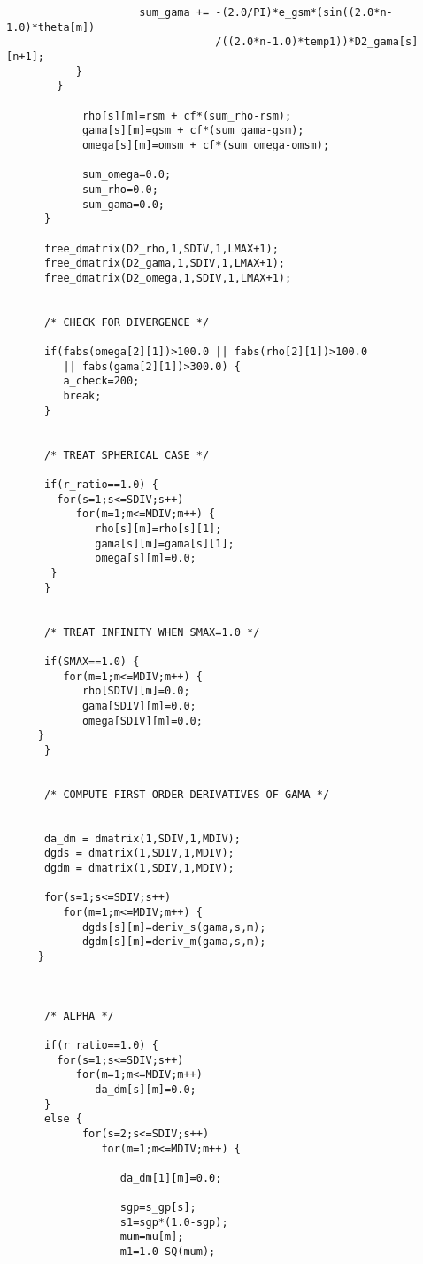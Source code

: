 \begin{verbatim}
                     sum_gama += -(2.0/PI)*e_gsm*(sin((2.0*n-1.0)*theta[m])
                                 /((2.0*n-1.0)*temp1))*D2_gama[s][n+1];   
	       }
	    }
	   
            rho[s][m]=rsm + cf*(sum_rho-rsm);
            gama[s][m]=gsm + cf*(sum_gama-gsm);
            omega[s][m]=omsm + cf*(sum_omega-omsm);

            sum_omega=0.0;
            sum_rho=0.0;
            sum_gama=0.0; 
	  }

      free_dmatrix(D2_rho,1,SDIV,1,LMAX+1);
      free_dmatrix(D2_gama,1,SDIV,1,LMAX+1);
      free_dmatrix(D2_omega,1,SDIV,1,LMAX+1);


      /* CHECK FOR DIVERGENCE */

      if(fabs(omega[2][1])>100.0 || fabs(rho[2][1])>100.0 
         || fabs(gama[2][1])>300.0) {
         a_check=200; 
         break;
      }


      /* TREAT SPHERICAL CASE */
      
      if(r_ratio==1.0) {
        for(s=1;s<=SDIV;s++)
           for(m=1;m<=MDIV;m++) {
              rho[s][m]=rho[s][1];
              gama[s][m]=gama[s][1];
              omega[s][m]=0.0;          
	   }
      }
      

      /* TREAT INFINITY WHEN SMAX=1.0 */

      if(SMAX==1.0) {
         for(m=1;m<=MDIV;m++) {
            rho[SDIV][m]=0.0;
            gama[SDIV][m]=0.0;
            omega[SDIV][m]=0.0;
	 }
      } 

      
      /* COMPUTE FIRST ORDER DERIVATIVES OF GAMA */ 


      da_dm = dmatrix(1,SDIV,1,MDIV);
      dgds = dmatrix(1,SDIV,1,MDIV);
      dgdm = dmatrix(1,SDIV,1,MDIV); 
 
      for(s=1;s<=SDIV;s++)
         for(m=1;m<=MDIV;m++) {
            dgds[s][m]=deriv_s(gama,s,m);
            dgdm[s][m]=deriv_m(gama,s,m);
	 }



      /* ALPHA */
 
      if(r_ratio==1.0) {
        for(s=1;s<=SDIV;s++)
           for(m=1;m<=MDIV;m++)
              da_dm[s][m]=0.0; 
      } 
      else {
            for(s=2;s<=SDIV;s++)
               for(m=1;m<=MDIV;m++) {

                  da_dm[1][m]=0.0; 
       
                  sgp=s_gp[s];
                  s1=sgp*(1.0-sgp);
                  mum=mu[m]; 
                  m1=1.0-SQ(mum);
          

\end{verbatim}
